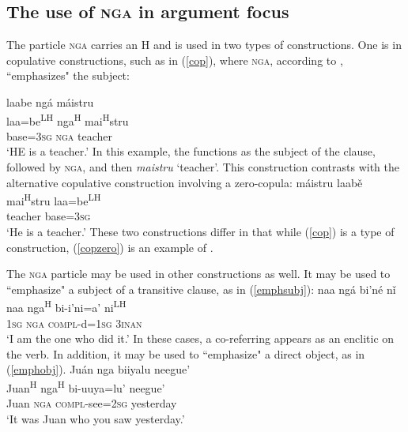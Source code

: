 \subsection{The use of \textsc{nga} in argument focus}\label{ngaargfoc}

The particle \textsc{nga} carries an H  and is used in two types of constructions. One is in copulative constructions, such as in (\ref{cop}), where \textsc{nga}, according to \citet[94]{pickett1998}, ``emphasizes" the subject:

\ea\label{cop}
\glll laabe ng\'{a} m\'{a}istru \\
laa=be\textsuperscript{LH} nga\textsuperscript{H} mai\textsuperscript{H}stru \\
base=3\textsc{sg} \textsc{nga} teacher \\
\glt `HE is a teacher.' \hfill \citep[94]{pickett1998}
\z
In this example, the  functions as the subject of the clause, followed by \textsc{nga}, and then \textit{maistru} `teacher'. This construction contrasts with the alternative copulative construction involving a zero-copula:
\ea\label{copzero}
\glll m\'{a}istru laab\v{e} \\
mai\textsuperscript{H}stru laa=be\textsuperscript{LH} \\
teacher base=3\textsc{sg}  \\
\glt `He is a teacher.' 
\z
These two constructions differ in that while (\ref{cop}) is a type of  construction, (\ref{copzero}) is an example of . 

The \textsc{nga} particle may be used in other constructions as well. It may be used to ``emphasize" a subject of a transitive clause, as in (\ref{emphsubj}):
\ea\label{emphsubj}
\glll naa ng\'{a} bi'n\'{e} n\v{i} \\
naa nga\textsuperscript{H} bi-i'ni=a' ni\textsuperscript{LH} \\
1\textsc{sg} \textsc{nga} \textsc{compl}-d=1\textsc{sg} 3\textsc{inan} \\
\glt `I am the one who did it.' \hfill \citep[98]{pickett1998}
\z
In these cases, a co-referring  appears as an enclitic on the verb. In addition, it may  be used to ``emphasize" a direct object, as in (\ref{emphobj}).
\ea\label{emphobj} 
\glll Ju\'{a}n nga biiyalu neegue' \\
Juan\textsuperscript{H} nga\textsuperscript{H} bi-uuya=lu' neegue' \\
Juan \textsc{nga} \textsc{compl}-see=2\textsc{sg} yesterday \\
\glt `It was Juan who you saw yesterday.' \hfill \citep[98]{pickett1998}


